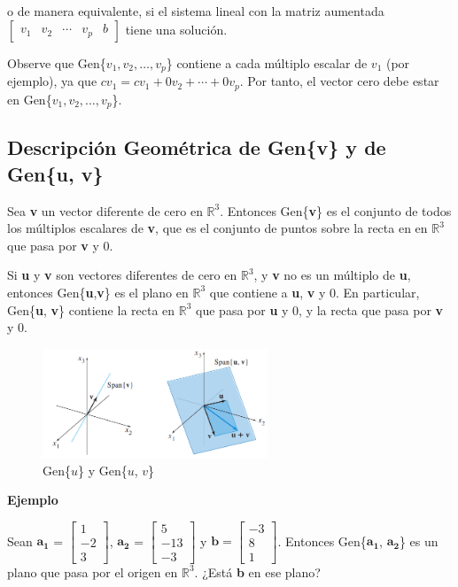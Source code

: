 \documentclass{article}
\begin{document}
o de manera equivalente, si el sistema lineal con la matriz aumentada $\begin{bmatrix} v_1 & v_2 & \dotsb & v_p & b \end{bmatrix}$ tiene una solución.

Observe que Gen\{$v_1,v_2,\dots, v_p$\} contiene a cada múltiplo escalar de $v_1$ (por ejemplo), ya que $cv_1 = cv_1 + 0v_2 + \dotsb + 0v_p$. Por tanto, el vector cero debe estar en Gen\{$v_1,v_2,\dots, v_p$\}.

\subsection*{Descripción Geométrica de Gen\{v\} y de Gen\{u, v\}}

Sea \textbf{v} un vector diferente de cero en $\mathbb{R}^3$. Entonces Gen\{\textbf{v}\} es el conjunto de todos los múltiplos escalares de \textbf{v}, que es el conjunto de puntos sobre la recta en en $\mathbb{R}^3$ que pasa por \textbf{v} y 0. 

Si \textbf{u} y \textbf{v} son vectores diferentes de cero en $\mathbb{R}^3$, y \textbf{v} no es un múltiplo de \textbf{u}, entonces Gen\{\textbf{u},\textbf{v}\} es el plano en $\mathbb{R}^3$ que contiene a \textbf{u}, \textbf{v} y 0. En particular, Gen\{\textbf{u}, \textbf{v}\} contiene la recta en $\mathbb{R}^3$ que pasa por \textbf{u} y 0, y la recta que pasa por \textbf{v} y 0.

\begin{figure}[ht]
    \centerline{\includegraphics[width=0.6\textwidth]{image11.png}}
    \caption{Gen\{\textbf{$u$}\} y Gen\{\textbf{$u$}, \textbf{$v$}\}}
    \label{}
\end{figure}

\begin{large}
    \textbf{Ejemplo}
\end{large}

Sean $\mathbf{a_1}$ = $\begin{bmatrix} 1\\-2\\3 \end{bmatrix}$, $\mathbf{a_2}$ = $\begin{bmatrix} 5\\-13\\-3 \end{bmatrix}$ y $\mathbf{b} = \begin{bmatrix} -3\\8\\1 \end{bmatrix}$. Entonces  Gen\{$\mathbf{a_1}$, $\mathbf{a_2}$\} es un plano que pasa por el origen en $\mathbb{R}^3$. ¿Está \textbf{b} en ese plano?
\end{document}
